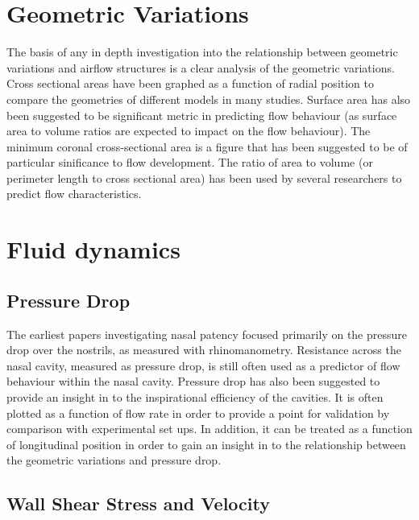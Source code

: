 \section{Geometric Variations}
The basis of any in depth investigation into the relationship between geometric variations and airflow structures is a clear analysis of the geometric variations. Cross sectional areas have been graphed as a function of radial position to compare the geometries of different models in many studies\cite{Xi2012, Zhu2011, Lindemann2008, Garcia2007}. Surface area has also been suggested to be significant metric in predicting flow behaviour (as surface area to volume ratios are expected to impact on the flow behaviour\cite{Xi2012, Garcia2007}). The minimum coronal cross-sectional area is a figure that has been suggested to be of particular sinificance to flow development\cite{Lindemann2008}. The ratio of area to volume (or perimeter length to cross sectional area) has been used by several researchers to predict flow characteristics\cite{Xi2012, Garcia2007}.

\section{Fluid dynamics}
\subsection{Pressure Drop}

The earliest papers investigating nasal patency focused primarily on the pressure drop over the nostrils, as measured with rhinomanometry\cite{Martin1981}. 
Resistance across the nasal cavity, measured as pressure drop, is still often used as a predictor of flow behaviour within the nasal cavity\cite{Edelstein1996, Lindemann2008, WhanKim2007}. Pressure drop has also been suggested to provide an insight in to the inspirational efficiency of the cavities\cite{Lintermann2013}. It is often plotted as a function of flow rate in order to provide a point for validation by comparison with experimental set ups\cite{Wen2008, Inthavong2014}. In addition, it can be treated as a function of longitudinal position in order to gain an insight in to the relationship between the geometric variations and pressure drop\cite{Lintermann2013}.

\subsection{Wall Shear Stress and Velocity}

